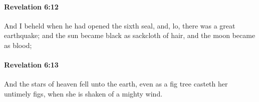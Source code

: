 		\paragraph{Revelation 6:12} %
			\label{REVELATIONNT-6-12}

			And I beheld when he had opened the sixth seal, and, lo, there was a great earthquake; and the sun became black as sackcloth of hair, and the moon became as blood;

			\begin{framed}
			\scriptsize
				\begin{compactdesc}
					\item[SBLG] 
				\end{compactdesc}
			\end{framed}

		\paragraph{Revelation 6:13} %
			\label{REVELATIONNT-6-13}

			And the stars of heaven fell unto the earth, even as a fig tree casteth her untimely figs, when she is shaken of a mighty wind.

